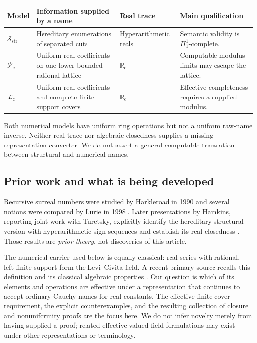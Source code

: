 \documentclass[11pt,letterpaper]{article}
\numberwithin{equation}{section}
\theoremstyle{definition}
\theoremstyle{remark}
\newcommand{\Rc}{\mathbb R_{\mathrm c}}
\newcommand{\Sc}{\mathcal S_{\mathrm{str}}}
\newcommand{\Lc}{\mathcal L_{\mathrm c}}
\newcommand{\Pc}{\mathcal P_{\mathrm c}}
\begin{document}
\begin{center}
\renewcommand{\arraystretch}{1.17}
\begin{tabular}{@{}P{.16\textwidth}P{.29\textwidth}P{.22\textwidth}P{.24\textwidth}@{}}
\toprule
Model & Information supplied by a name & Real trace & Main qualification\\
\midrule
$\Sc$ & Hereditary enumerations of separated cuts & Hyperarithmetic reals &
Semantic validity is $\Pi^1_1$-complete.\\
$\Pc$ & Uniform real coefficients on one lower-bounded rational lattice &
$\Rc$ & Computable-modulus limits may escape the lattice.\\
$\Lc$ & Uniform real coefficients and complete finite support covers &
$\Rc$ & Effective completeness requires a supplied modulus.\\
\bottomrule
\end{tabular}
\end{center}
Both numerical models have uniform ring operations but not a uniform raw-name
inverse. Neither real trace nor algebraic closedness supplies a missing
representation converter. We do not assert a general computable translation
between structural and numerical names.

\subsection{Prior work and what is being developed}

Recursive surreal numbers were studied by Harkleroad in 1990 and several
notions were compared by Lurie in 1998 \cite{harkleroad,lurie}. Later
presentations by Hamkins, reporting joint work with Turetsky, explicitly
identify the hereditary structural version with hyperarithmetic sign
sequences and establish its real closedness \cite{hamkins,hamkins2025,turetsky}.
Those results are \emph{prior theory}, not discoveries of this article.

The numerical carrier used below is equally classical: real series with
rational, left-finite support form the Levi--Civita field. A recent primary
source recalls this definition and its classical algebraic properties
\cite[\S1.1]{restrepo}. Our question is which of its elements and operations
are effective under a representation that continues to accept ordinary
Cauchy names for real constants. The effective finite-cover requirement,
the explicit counterexamples, and the resulting collection of closure and
nonuniformity proofs are the focus here. We do not infer novelty merely
from having supplied a proof; related effective valued-field formulations
may exist under other representations or terminology.
\end{document}
